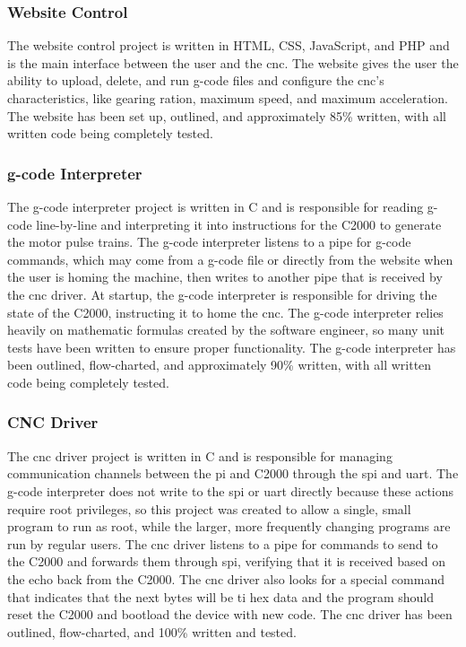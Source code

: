 \subsubsection{Website Control}
The website control project is written in HTML, CSS, JavaScript, and PHP and is the main interface between the user and the \gls{cnc}.
The website gives the user the ability to upload, delete, and run g-code files and configure the \gls{cnc}'s characteristics, like gearing ration, maximum speed, and maximum acceleration.
The website has been set up, outlined, and approximately 85\% written, with all written code being completely tested.

\subsubsection{g-code Interpreter}
The g-code interpreter project is written in C and is responsible for reading g-code line-by-line and interpreting it into instructions for the C2000 to generate the motor pulse trains.
The g-code interpreter listens to a pipe for g-code commands, which may come from a g-code file or directly from the website when the user is homing the machine, then writes to another pipe that is received by the \gls{cnc} driver.
At startup, the g-code interpreter is responsible for driving the state of the C2000, instructing it to home the \gls{cnc}.
The g-code interpreter relies heavily on mathematic formulas created by the software engineer, so many unit tests have been written to ensure proper functionality.
The g-code interpreter has been outlined, flow-charted, and approximately 90\% written, with all written code being completely tested.

\subsubsection{CNC Driver}
The \gls{cnc} driver project is written in C and is responsible for managing communication channels between the \gls{pi} and C2000 through the \gls{spi} and \gls{uart}.
The g-code interpreter does not write to the \gls{spi} or \gls{uart} directly because these actions require root privileges, so this project was created to allow a single, small program to run as root, while the larger, more frequently changing programs are run by regular users.
The \gls{cnc} driver listens to a pipe for commands to send to the C2000 and forwards them through \gls{spi}, verifying that it is received based on the echo back from the C2000.
The \gls{cnc} driver also looks for a special command that indicates that the next bytes will be \gls{ti} hex data and the program should reset the C2000 and bootload the device with new code.
The \gls{cnc} driver has been outlined, flow-charted, and 100\% written and tested.

